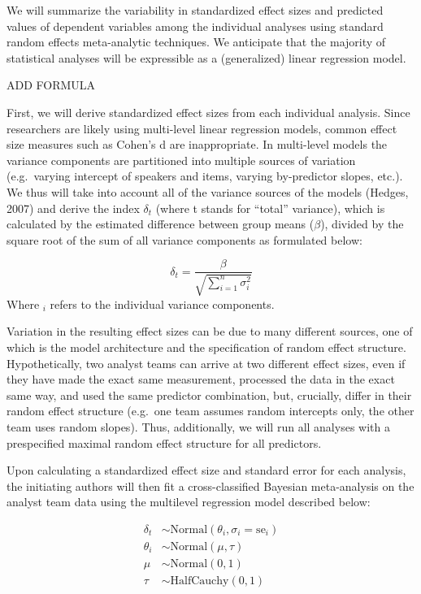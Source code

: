 \documentclass[
  english,
  man]{apa6}
\begin{document}
We will summarize the variability in standardized effect sizes and predicted values of dependent variables among the individual analyses using standard random effects meta-analytic techniques.
We anticipate that the majority of statistical analyses will be expressible as a (generalized) linear regression model.

ADD FORMULA

First, we will derive standardized effect sizes from each individual analysis.
Since researchers are likely using multi-level linear regression models, common effect size measures such as Cohen's d are inappropriate.
In multi-level models the variance components are partitioned into multiple sources of variation (e.g.~varying intercept of speakers and items, varying by-predictor slopes, etc.).
We thus will take into account all of the variance sources of the models (Hedges, 2007) and derive the index \(\delta_t\) (where t stands for \enquote{total} variance), which is calculated by the estimated difference between group means (\(\beta\)), divided by the square root of the sum of all variance components as formulated below:

\[\delta_t = \frac{\beta}{\sqrt{\sum_{i=1}^{n} \sigma^2_{i}}}\]
Where \(_i\) refers to the individual variance components.

Variation in the resulting effect sizes can be due to many different sources, one of which is the model architecture and the specification of random effect structure.
Hypothetically, two analyst teams can arrive at two different effect sizes, even if they have made the exact same measurement, processed the data in the exact same way, and used the same predictor combination, but, crucially, differ in their random effect structure (e.g.~one team assumes random intercepts only, the other team uses random slopes).
Thus, additionally, we will run all analyses with a prespecified maximal random effect structure for all predictors.

Upon calculating a standardized effect size and standard error for each analysis, the initiating authors will then fit a cross-classified Bayesian meta-analysis on the analyst team data using the multilevel regression model described below:

\[
\begin{aligned}
\delta_t & \sim \text{Normal}(\theta_i, \sigma_i = \text{se}_i) \\
\theta_i     & \sim \text{Normal} (\mu, \tau) \\
\mu          & \sim \text{Normal} (0, 1) \\
\tau         & \sim \text{HalfCauchy} (0, 1)
\end{aligned}
\]
\end{document}
